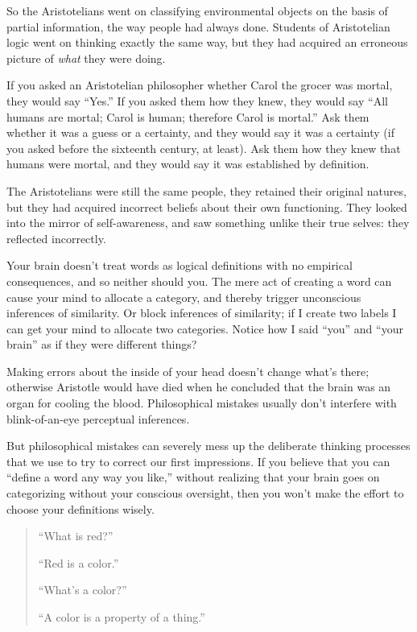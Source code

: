 {
 So the Aristotelians went on classifying environmental objects on
the basis of partial information, the way people had always done.
Students of Aristotelian logic went on thinking exactly the same way,
but they had acquired an erroneous picture of \textit{what} they were
doing.}

{
 If you asked an Aristotelian philosopher whether Carol the grocer
was mortal, they would say ``Yes.''
If you asked them how they knew, they would say ``All
humans are mortal; Carol is human; therefore Carol is
mortal.'' Ask them whether it was a guess or a
certainty, and they would say it was a certainty (if you asked before
the sixteenth century, at least). Ask them how they knew that humans
were mortal, and they would say it was established by definition.}

{
 The Aristotelians were still the same people, they retained their
original natures, but they had acquired incorrect beliefs about their
own functioning. They looked into the mirror of self-awareness, and saw
something unlike their true selves: they reflected incorrectly.}

{
 Your brain doesn't treat words as logical
definitions with no empirical consequences, and so neither should you.
The mere act of creating a word can cause your mind to allocate a
category, and thereby trigger unconscious inferences of similarity. Or
block inferences of similarity; if I create two labels I can get your
mind to allocate two categories. Notice how I said
``you'' and ``your
brain'' as if they were different things?}

{
 Making errors about the inside of your head
doesn't change what's there; otherwise
Aristotle would have died when he concluded that the brain was an organ
for cooling the blood. Philosophical mistakes usually
don't interfere with blink-of-an-eye perceptual
inferences.}

{
 But philosophical mistakes can severely mess up the deliberate
thinking processes that we use to try to correct our first impressions.
If you believe that you can ``define a word any way
you like,'' without realizing that your brain goes on
categorizing without your conscious oversight, then you
won't make the effort to choose your definitions
wisely.}

\myendsectiontext


\begin{quote}
{
 ``What is red?''}

{
 ``Red is a color.''}

{
 ``What's a
color?''}

{
 ``A color is a property of a
  thing.''}
\end{quote}

